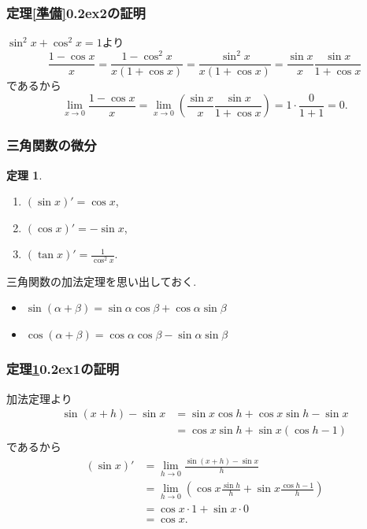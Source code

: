 \documentclass[dvipdfmx,cjk,10.2pt]{beamer}
\newcommand{\ctext}[1]{\raise0.2ex\hbox{\textcircled{\scriptsize{#1}}}}
\theoremstyle{definition}
\newtheorem{Thm}{定理}[section]
\begin{document}


\begin{frame}
\frametitle{定理\ref{準備}\ctext{2}の証明}

$\sin^2x +\cos^2 x=1$より
$$
\frac{1-\cos x}{x}
=
\frac{1-\cos ^2x}{x(1+\cos x)}
=
\frac{\sin ^2x}{x(1+\cos x)}
=
\frac{\sin x}{x}
\frac{\sin x}{1+\cos x}
$$
であるから 
$$
\lim_{x \to 0} \frac{1-\cos x}{x}=
\lim_{x \to 0} (\frac{\sin x}{x}
\frac{\sin x}{1+\cos x})
=1 \cdot \frac{0}{1+1}=0. 
$$

\end{frame}






\begin{frame}
\frametitle{三角関数の微分}



\begin{Thm} \label{三角関数微分}
\begin{enumerate}
\item $(\sin x)'=\cos x$,
\item  $(\cos x)' = -\sin x$,
\item $(\tan x)'=\frac{1}{\cos^2 x}$. 
\end{enumerate}
\end{Thm}

三角関数の加法定理を思い出しておく. 
\begin{itemize}
\item $\sin(\alpha+\beta)=\sin \alpha \cos \beta + \cos \alpha \sin \beta$
\item $\cos(\alpha+\beta)=\cos \alpha \cos \beta - \sin \alpha \sin \beta$
\end{itemize}

\end{frame}




\begin{frame}
\frametitle{定理\ref{三角関数微分}\ctext{1}の証明}

加法定理より
\begin{align*}
\sin(x +h)-\sin x & = \sin x \cos h + \cos x \sin h -\sin x \\
& =  \cos x \sin h + \sin x( \cos h-1)
\end{align*}
であるから
\begin{align*}
(\sin x)' &= \lim_{h \to 0} \frac{\sin(x +h)-\sin x}{h} \\
& =  \lim_{h \to 0} (\cos x \frac{\sin h}{h} + \sin x \frac{\cos h-1}{h}) \\
& =\cos x \cdot 1 + \sin x \cdot 0 \\
& = \cos x. 
\end{align*}
\end{frame}
\end{document}

